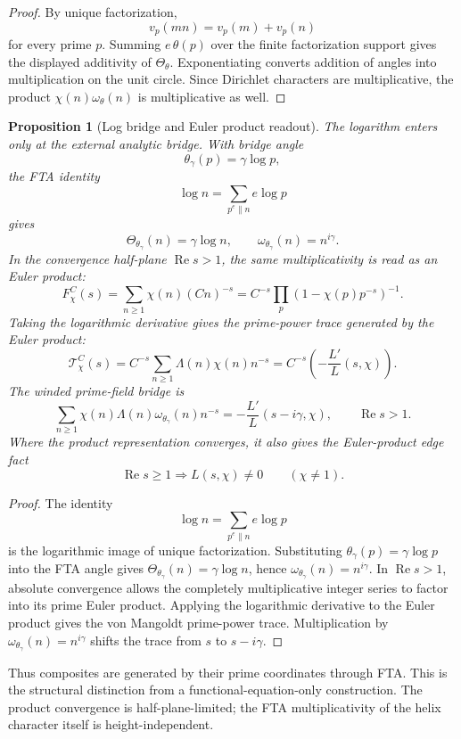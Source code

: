 \documentclass[11pt]{article}
\newtheorem{proposition}[definition]{Proposition}
\DeclareMathOperator{\Ree}{Re}
\begin{document}
\begin{proof}
By unique factorization,
\[
  v_p(mn)=v_p(m)+v_p(n)
\]
for every prime $p$.  Summing $e\,\theta(p)$ over the finite factorization
support gives the displayed additivity of $\Theta_\theta$.  Exponentiating
converts addition of angles into multiplication on the unit circle.  Since
Dirichlet characters are multiplicative, the product
$\chi(n)\omega_\theta(n)$ is multiplicative as well.

\end{proof}

\begin{proposition}[Log bridge and Euler product readout]
The logarithm enters only at the external analytic bridge.  With bridge angle
\[
  \theta_\gamma(p)=\gamma\log p,
\]
the FTA identity
\[
  \log n=\sum_{p^e\parallel n} e\log p
\]
gives
\[
  \Theta_{\theta_\gamma}(n)=\gamma\log n,
  \qquad
  \omega_{\theta_\gamma}(n)=n^{i\gamma}.
\]
In the convergence half-plane $\Ree s>1$, the same multiplicativity is read as
an Euler product:
\[
  F_\chi^C(s)
  =
  \sum_{n\ge1}\chi(n)(Cn)^{-s}
  =
  C^{-s}\prod_p\left(1-\chi(p)p^{-s}\right)^{-1}.
\]
Taking the logarithmic derivative gives the prime-power trace generated by the
Euler product:
\[
  \mathcal T_\chi^C(s)
  =
  C^{-s}\sum_{n\ge1}\Lambda(n)\chi(n)n^{-s}
  =
  C^{-s}\left(-\frac{L'}{L}(s,\chi)\right).
\]
The winded prime-field bridge is
\[
  \sum_{n\ge1}\chi(n)\Lambda(n)\omega_{\theta_\gamma}(n)n^{-s}
  =
  -\frac{L'}{L}(s-i\gamma,\chi),
  \qquad \Ree s>1.
\]
Where the product representation converges, it also gives the Euler-product
edge fact
\[
  \Ree s\ge1\Longrightarrow L(s,\chi)\ne0
  \qquad(\chi\ne1).
\]
\end{proposition}

\begin{proof}
The identity
\[
  \log n=\sum_{p^e\parallel n} e\log p
\]
is the logarithmic image of unique factorization.  Substituting
$\theta_\gamma(p)=\gamma\log p$ into the FTA angle gives
$\Theta_{\theta_\gamma}(n)=\gamma\log n$, hence
$\omega_{\theta_\gamma}(n)=n^{i\gamma}$.  In $\Ree s>1$, absolute convergence
allows the completely multiplicative integer series to factor into its prime
Euler product.  Applying the logarithmic derivative to the Euler product gives
the von Mangoldt prime-power trace.  Multiplication by
$\omega_{\theta_\gamma}(n)=n^{i\gamma}$ shifts the trace from $s$ to
$s-i\gamma$.

\end{proof}

Thus composites are generated by their prime coordinates through FTA.  This is
the structural distinction from a
functional-equation-only construction.  The product convergence is
half-plane-limited; the FTA multiplicativity of the helix character itself is
height-independent.
\end{document}
